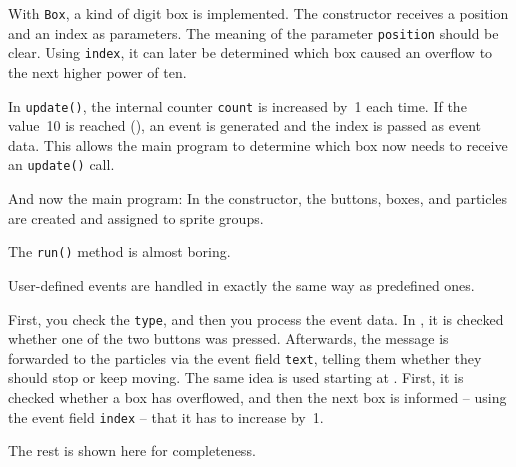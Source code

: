 With \texttt{Box}, a kind of digit box is implemented. The constructor receives a position and an index as parameters. The meaning of the parameter \texttt{position} should be clear. Using \texttt{index}, it can later be determined which box caused an overflow to the next higher power of ten.

In \texttt{update()}, the internal counter \texttt{count} is increased by~1 each time. If the value~10 is reached (), an event is generated and the index is passed as event data. This allows the main program to determine which box now needs to receive an \texttt{update()} call.


And now the main program: In the constructor, the buttons, boxes, and particles are created and assigned to sprite groups.


The \texttt{run()} method is almost boring.


\begin{hintbox}
	User-defined events are handled in exactly the same way as predefined ones. 
\end{hintbox}

First, you check the \texttt{type}, and then you process the event data. In , it is checked whether one of the two buttons was pressed. Afterwards, the message is forwarded to the particles via the event field \texttt{text}, telling them whether they should stop or keep moving. The same idea is used starting at . First, it is checked whether a box has overflowed, and then the next box is informed -- using the event field \texttt{index} -- that it has to increase by~1.


The rest is shown here for completeness.


